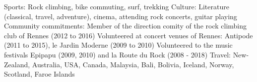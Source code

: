 \begin{cvskills}
  \cvskill
    {Sports:}
	{Rock climbing, bike commuting, surf, trekking}
  \cvskill
    {Culture:}
	{
        Literature (classical, travel, adventure), cinema, attending rock
        concerts, guitar playing
	}
  \cvskill
    {Community commitments:}
	{
        Member of the direction comity of the rock climbing club of Rennes
        (2012 to 2016)\newline
        Volunteered at concert venues of Rennes: Antipode (2011 to 2015), le
        Jardin Moderne (2009 to 2010)\lastnewline
        Volunteered to the music festivals Epipapu (2009, 2010) and la Route du
        Rock (2008 - 2018)
    }
  \cvskill
    {Travel:}
    {New-Zealand, Australia, USA, Canada, Malaysia, Bali, Bolivia, Iceland,
    Norway, Scotland, Faroe Islands}
\end{cvskills}
